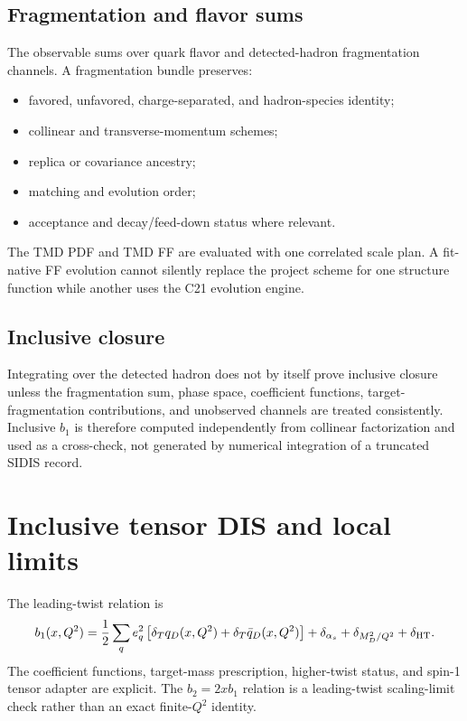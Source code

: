 \documentclass[11pt]{article}
\begin{document}
\subsection{Fragmentation and flavor sums}

The observable sums over quark flavor and detected-hadron fragmentation channels.  A fragmentation bundle preserves:
\begin{itemize}
\item favored, unfavored, charge-separated, and hadron-species identity;
\item collinear and transverse-momentum schemes;
\item replica or covariance ancestry;
\item matching and evolution order;
\item acceptance and decay/feed-down status where relevant.
\end{itemize}
The TMD PDF and TMD FF are evaluated with one correlated scale plan.  A fit-native FF evolution cannot silently replace the project scheme for one structure function while another uses the C21 evolution engine.

\subsection{Inclusive closure}

Integrating over the detected hadron does not by itself prove inclusive closure unless the fragmentation sum, phase space, coefficient functions, target-fragmentation contributions, and unobserved channels are treated consistently.  Inclusive \(b_1\) is therefore computed independently from collinear factorization and used as a cross-check, not generated by numerical integration of a truncated SIDIS record.

\section{Inclusive tensor DIS and local limits}
\label{sec:inclusive}

The leading-twist relation is
\begin{equation}
 b_1(x,Q^2)=
 \frac12\sum_q e_q^2
 \left[\delta_Tq_D(x,Q^2)+\delta_T\bar q_D(x,Q^2)\right]
 +\delta_{\alpha_s}+\delta_{M_D^2/Q^2}+\delta_{\rm HT}.
 \label{eq:b1}
\end{equation}
The coefficient functions, target-mass prescription, higher-twist status, and spin-1 tensor adapter are explicit.  The \(b_2=2xb_1\) relation is a leading-twist scaling-limit check rather than an exact finite-\(Q^2\) identity.
\end{document}
